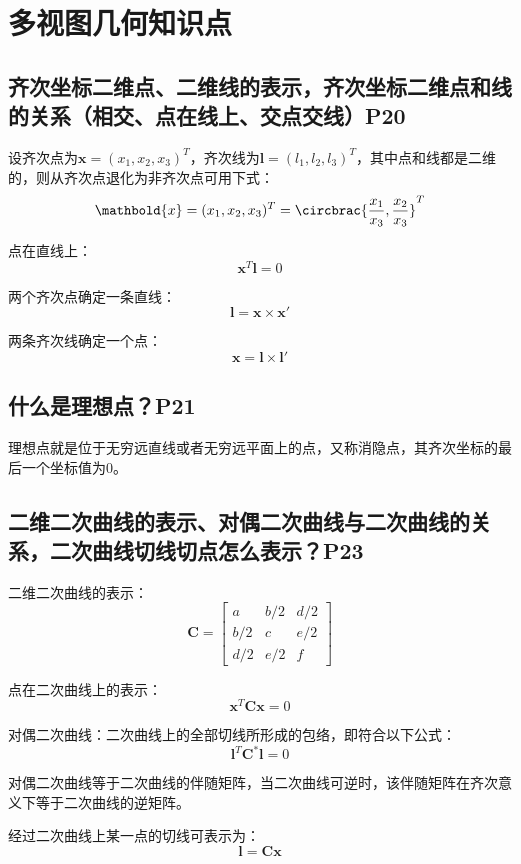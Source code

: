 \documentclass[11pt]{article}
\begin{document}
\section{多视图几何知识点}
\subsection{齐次坐标二维点、二维线的表示，齐次坐标二维点和线的关系（相交、点在线上、交点交线）P20}
设齐次点为$\mathbold{x}=(x_1,x_2,x_3)^T$，齐次线为$\mathbold{l}=(l_1,l_2,l_3)^T$，其中点和线都是二维的，则从齐次点退化为非齐次点可用下式：
\begin{equation*}
  \mathbold{x}=(x_1,x_2,x_3)^T=\circbrac{\frac{x_1}{x_3},\frac{x_2}{x_3}}^T
\end{equation*}\par
点在直线上：
\begin{equation*}
  \mathbold{x}^T\mathbold{l}=0
\end{equation*}\par
两个齐次点确定一条直线：
\begin{equation*}
  \mathbold{l}=\mathbold{x}\times\mathbold{x}'
\end{equation*}\par
两条齐次线确定一个点：
\begin{equation*}
  \mathbold{x}=\mathbold{l}\times\mathbold{l}'
\end{equation*}\par
\subsection{什么是理想点？P21}
理想点就是位于无穷远直线或者无穷远平面上的点，又称消隐点，其齐次坐标的最后一个坐标值为0。
\subsection{二维二次曲线的表示、对偶二次曲线与二次曲线的关系，二次曲线切线切点怎么表示？P23}
二维二次曲线的表示：
\begin{equation*}
  \mathbold{C}=\begin{bmatrix}
    a   & b/2 & d/2 \\
    b/2 & c   & e/2 \\
    d/2 & e/2 & f
  \end{bmatrix}
\end{equation*}\par
点在二次曲线上的表示：
\begin{equation*}
  \mathbold{x}^T\mathbold{C}\mathbold{x}=0
\end{equation*}\par
对偶二次曲线：二次曲线上的全部切线所形成的包络，即符合以下公式：
\begin{equation*}
  \mathbold{l}^T\mathbold{C}^*\mathbold{l}=0
\end{equation*}\par
对偶二次曲线等于二次曲线的伴随矩阵，当二次曲线可逆时，该伴随矩阵在齐次意义下等于二次曲线的逆矩阵。\par
经过二次曲线上某一点的切线可表示为：
\begin{equation*}
  \mathbold{l=Cx}
\end{equation*}
\end{document}
